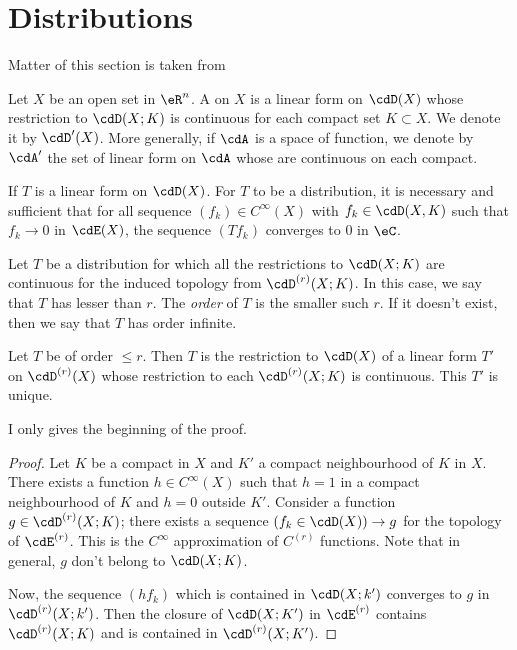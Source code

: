 \section{Distributions}\label{sec:Distrib}

Matter of this section is taken from \cite{Treves,Dieu3}

Let $X$ be an open set in $\eR^n$. A  on $X$ is a linear form on $\cdD(X)$ whose restriction to $\cdD(X;K)$ is continuous for each compact set $K\subset X$. We denote it by $\cdD'(X)$. More generally, if $\cdA$ is a space of function, we denote by $\cdA'$ the set of linear form on $\cdA$ whose are continuous on each compact.

If $T$ is a linear form on $\cdD(X)$. For $T$ to be a distribution, it is necessary and sufficient that for all sequence $(f_k)\in C^{\infty}(X)$  with $f_k\in\cdD(X,K)$ such that $f_k\to 0$ in $\cdE(X)$, the sequence $(Tf_k)$ converges to $0$ in $\eC$.

Let $T$ be a distribution for which all the restrictions to $\cdD(X;K)$ are continuous for the induced topology from $\cdD^{(r)}(X;K)$. In this case, we say that $T$ has \label{pg:reforder} lesser than $r$. The \emph{order} of $T$ is the smaller such $r$. If it doesn't exist, then we say that $T$ has order infinite.

\begin{proposition}
Let $T$ be of order $\leq r$. Then $T$ is the restriction to $\cdD(X)$ of a linear form $T'$ on $\cdD^{(r)}(X)$ whose restriction to each $\cdD^{(r)}(X;K)$ is continuous. This $T'$ is unique.
\end{proposition}

I only gives the beginning of the proof.

\begin{proof}
Let $K$ be a compact in  $X$ and $K'$ a compact neighbourhood of $K$ in $X$. There exists a function $h\in C^{\infty}(X)$ such that $h=1$ in a compact neighbourhood of $K$ and $h=0$ outside $K'$. Consider a function $g\in\cdD^{(r)}(X;K)$; there exists a sequence $(f_k\in\cdD(X))\to g$ for the topology of $\cdE^{(r)}$. This is the $ C^{\infty}$ approximation of $C^{(r)}$ functions. Note that in general, $g$ don't belong to $\cdD(X;K)$.

Now, the sequence $(hf_k)$ which is contained in $\cdD(X;k')$ converges to $g$ in $\cdD^{(r)}(X;k')$. Then the closure of $\cdD(X;K')$ in $\cdE^{(r)}$ contains $\cdD^{(r)}(X;K)$ and is contained in $\cdD^{(r)}(X;K')$.
\end{proof}

